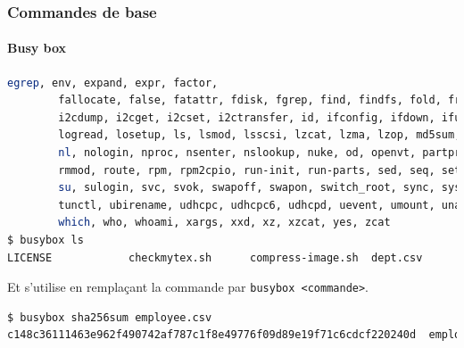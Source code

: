 \documentclass{beamer}
\begin{document}
    \begin{frame}[fragile]
        \transdissolve
        \frametitle{Commandes de base}
        \framesubtitle{Busy box}
        \begin{lstlisting}[language=bash,basicstyle=\tiny\ttfamily]
        egrep, env, expand, expr, factor,
        fallocate, false, fatattr, fdisk, fgrep, find, findfs, fold, free, freeramdisk, fsfreeze, fstrim, ftpget, ftpput, getopt, getty, grep, groups, gunzip, gzip, halt, head, hexdump, hostid, hostname, httpd, hwclock, i2cdetect,
        i2cdump, i2cget, i2cset, i2ctransfer, id, ifconfig, ifdown, ifup, init, insmod, ionice, ip, ipcalc, kill, killall, klogd, last, less, link, linux32, linux64, linuxrc, ln, loadfont, loadkmap, logger, login, logname,
        logread, losetup, ls, lsmod, lsscsi, lzcat, lzma, lzop, md5sum, mdev, microcom, mim, mkdir, mkdosfs, mke2fs, mkfifo, mknod, mkpasswd, mkswap, mktemp, modinfo, modprobe, more, mount, mt, mv, nameif, nbd-client, nc, netstat,
        nl, nologin, nproc, nsenter, nslookup, nuke, od, openvt, partprobe, passwd, paste, patch, pidof, ping, ping6, pivot_root, poweroff, printf, ps, pwd, rdate, readlink, realpath, reboot, renice, reset, resume, rev, rm, rmdir,
        rmmod, route, rpm, rpm2cpio, run-init, run-parts, sed, seq, setkeycodes, setpriv, setsid, sh, sha1sum, sha256sum, sha3sum, sha512sum, shred, shuf, sleep, sort, ssl_client, start-stop-daemon, stat, static-sh, strings, stty,
        su, sulogin, svc, svok, swapoff, swapon, switch_root, sync, sysctl, syslogd, tac, tail, tar, taskset, tc, tee, telnet, telnetd, test, tftp, time, timeout, top, touch, tr, traceroute, traceroute6, true, truncate, ts, tty,
        tunctl, ubirename, udhcpc, udhcpc6, udhcpd, uevent, umount, uname, uncompress, unexpand, uniq, unix2dos, unlink, unlzma, unshare, unxz, unzip, uptime, usleep, uudecode, uuencode, vconfig, vi, w, watch, watchdog, wc, wget,
        which, who, whoami, xargs, xxd, xz, xzcat, yes, zcat
$ busybox ls
LICENSE            checkmytex.sh      compress-image.sh  dept.csv           employee.csv       sqlite-hr.sh       venv
        \end{lstlisting}
        Et s'utilise en remplaçant la commande par \lstinline{busybox <commande>}.
        \begin{lstlisting}[language=bash,basicstyle=\tiny\ttfamily]
$ busybox sha256sum employee.csv
c148c36111463e962f490742af787c1f8e49776f09d89e19f71c6cdcf220240d  employee.csv
        \end{lstlisting}
    \end{frame}
\end{document}
